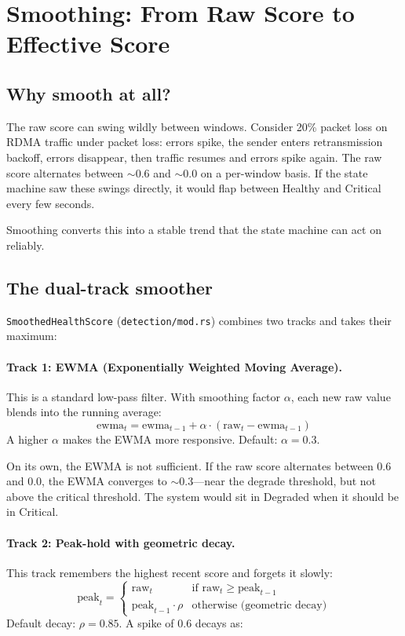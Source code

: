 \documentclass[11pt]{article}
\begin{document}
\section{Smoothing: From Raw Score to Effective Score}
\label{sec:smoothing}

\subsection{Why smooth at all?}

The raw score can swing wildly between windows. Consider 20\% packet loss on
RDMA traffic under packet loss: errors spike, the sender enters retransmission
backoff, errors disappear, then traffic resumes and errors spike again. The raw
score alternates between $\sim$0.6 and $\sim$0.0 on
a per-window basis. If the state machine saw these swings directly, it would
flap between Healthy and Critical every few seconds.

Smoothing converts this into a stable trend that the state machine can act on
reliably.

\subsection{The dual-track smoother}

\texttt{SmoothedHealthScore} (\texttt{detection/mod.rs}) combines two tracks
and takes their maximum:

\paragraph{Track 1: EWMA (Exponentially Weighted Moving Average).}
This is a standard low-pass filter. With smoothing factor $\alpha$, each
new raw value blends into the running average:
\[
  \text{ewma}_t = \text{ewma}_{t-1} + \alpha \cdot (\text{raw}_t - \text{ewma}_{t-1})
\]
A higher $\alpha$ makes the EWMA more responsive. Default: $\alpha = 0.3$.

On its own, the EWMA is not sufficient. If the raw score alternates between
0.6 and 0.0, the EWMA converges to $\sim$0.3---near the degrade threshold,
but not above the critical threshold. The system would sit in Degraded when
it should be in Critical.

\paragraph{Track 2: Peak-hold with geometric decay.}
This track remembers the highest recent score and forgets it slowly:
\[
  \text{peak}_t = \begin{cases}
    \text{raw}_t & \text{if } \text{raw}_t \geq \text{peak}_{t-1} \\
    \text{peak}_{t-1} \cdot \rho & \text{otherwise (geometric decay)}
  \end{cases}
\]
Default decay: $\rho = 0.85$. A spike of 0.6 decays as:
\end{document}
